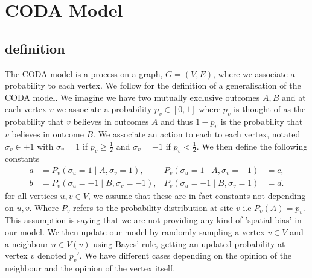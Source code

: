 \chapter{CODA Model}\label{sec:coda}

\section{definition}
The CODA model \cite{MARTINS_2008} is a process on a graph, \(G=(V,E)\), where we associate a probability to each vertex.
We follow \cite{martins2010} for the definition of a generalisation of the CODA model.
We imagine we have two mutually exclusive outcomes \(A,B\) and at each vertex \(v\) we associate a probability \(p_v\in[0,1]\) where \(p_v\) is thought of as the probability that \(v\) believes in outcomes \(A\) and thus \(1-p_v\) is the probability that \(v\) believes in outcome \(B\).
We associate an action to each to each vertex, notated \(\sigma_{v}\in\pm 1\) with \(\sigma_{v}=1\) if \(p_v\ge \frac{1}{2}\) and \(\sigma_v=-1\) if \(p_v<\frac{1}{2}\).
We then define the following constants
\be
\begin{align*}
	a &= P_v(\sigma_u=1\mid A,\sigma_v=1),& P_v(\sigma_u=1\mid A,\sigma_v=-1) & = c,\\
	b &= P_v(\sigma_u=-1\mid B,\sigma_v=-1),& P_v(\sigma_u=-1\mid B,\sigma_v=1)& = d.
\end{align*}
\ee
for all vertices \(u,v\in V\), we assume that these are in fact constants not depending on \(u,v\).
Where \(P_v\) refers to the probability distribution at site \(v\) i.e \(P_v(A)=p_v\).
This assumption is saying that we are not providing any kind of 'spatial bias' in our model.
We then update our model by randomly sampling a vertex \(v\in V\) and a neighbour \(u\in V(v)\) using Bayes' rule, getting an updated probability at vertex \(v\) denoted \(p_v'\).
We have different cases depending on the opinion of the neighbour and the opinion of the vertex itself.

